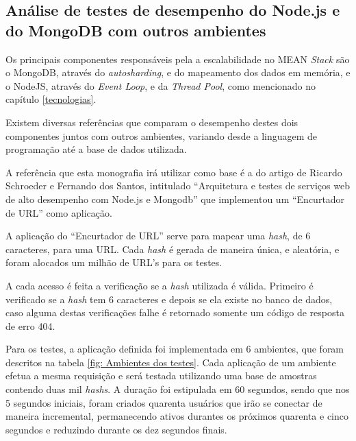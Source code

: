 \newpage

\subsection{Análise de testes de desempenho do Node.js e do MongoDB com outros ambientes}
Os principais componentes responsáveis pela a escalabilidade no MEAN \textit{Stack} são o MongoDB, através do \textit{autosharding}, e do mapeamento dos dados em memória, e o NodeJS, através do \textit{Event Loop}, e da \textit{Thread Pool}, como mencionado no capítulo \ref{tecnologias}.
    
Existem diversas referências que comparam o desempenho destes dois componentes juntos com outros ambientes, variando desde a linguagem de programação até a base de dados utilizada.

A referência que esta monografia irá utilizar como base é a do artigo de Ricardo Schroeder e Fernando dos Santos,  intitulado ``Arquitetura e testes de serviços web de alto desempenho com Node.js e Mongodb'' \cite{NodejsEMongodb} que implementou um ``Encurtador de URL'' como aplicação.

A aplicação do ``Encurtador de URL'' serve para mapear uma \textit{hash}, de 6 caracteres, para uma URL. Cada \textit{hash} é gerada de maneira única, e aleatória, e foram alocados um milhão de URL's para os testes.

A cada acesso é feita a verificação se a \textit{hash} utilizada é válida.  Primeiro é verificado se a \textit{hash} tem 6 caracteres e depois se ela existe no banco de dados, caso alguma destas verificações falhe é retornado somente um código de  resposta de erro 404. 

Para os testes, a aplicação definida foi implementada em 6 ambientes, que foram descritos na tabela \ref{fig: Ambientes dos testes}. Cada aplicação de um ambiente efetua a mesma requisição e será testada utilizando uma base de amostras contendo duas mil \textit{hashs}. A duração foi estipulada em 60 segundos, sendo que nos  5 segundos iniciais, foram criados quarenta usuários que irão se conectar de maneira incremental, permanecendo ativos durantes os próximos quarenta e cinco segundos e reduzindo durante os dez segundos finais. 

